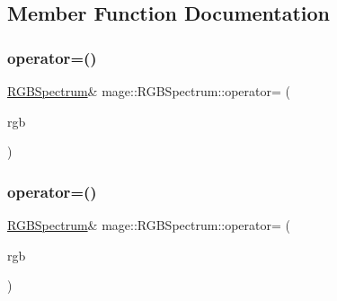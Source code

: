 \subsection{Member Function Documentation}
\hypertarget{structmage_1_1_r_g_b_spectrum_ac4701cc62489d27130853c3ba667a767}{}\label{structmage_1_1_r_g_b_spectrum_ac4701cc62489d27130853c3ba667a767} 
\subsubsection{\texorpdfstring{operator=()}{operator=()}\hspace{0.1cm}{\footnotesize\ttfamily [1/2]}}
{\footnotesize\ttfamily \hyperlink{structmage_1_1_r_g_b_spectrum}{R\+G\+B\+Spectrum}\& mage\+::\+R\+G\+B\+Spectrum\+::operator= (\begin{DoxyParamCaption}\item[{const \hyperlink{structmage_1_1_r_g_b_spectrum}{R\+G\+B\+Spectrum} \&}]{rgb }\end{DoxyParamCaption})\hspace{0.3cm}{\ttfamily [default]}}

\hypertarget{structmage_1_1_r_g_b_spectrum_a3a487cd0fcb35395c0979552dc551829}{}\label{structmage_1_1_r_g_b_spectrum_a3a487cd0fcb35395c0979552dc551829} 
\subsubsection{\texorpdfstring{operator=()}{operator=()}\hspace{0.1cm}{\footnotesize\ttfamily [2/2]}}
{\footnotesize\ttfamily \hyperlink{structmage_1_1_r_g_b_spectrum}{R\+G\+B\+Spectrum}\& mage\+::\+R\+G\+B\+Spectrum\+::operator= (\begin{DoxyParamCaption}\item[{\hyperlink{structmage_1_1_r_g_b_spectrum}{R\+G\+B\+Spectrum} \&\&}]{rgb }\end{DoxyParamCaption})\hspace{0.3cm}{\ttfamily [default]}}

